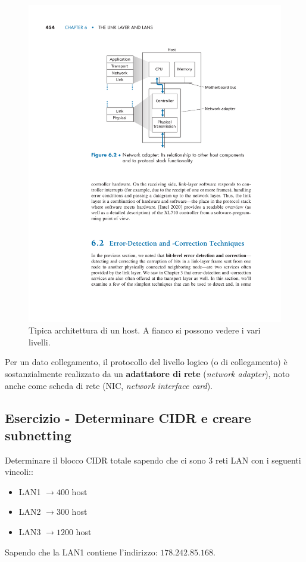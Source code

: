 \documentclass[a4paper]{article}
\begin{document}
	\begin{figure}[!htp]
		\centering
		\includegraphics[width=\textwidth]{img/architettura_host.pdf}
		\caption{Tipica architettura di un host. A fianco si possono vedere i vari livelli.}
	\end{figure}
	
	\noindent
	Per un dato collegamento, il protocollo del livello logico (o di collegamento) è sostanzialmente realizzato da un \textbf{adattatore di rete} (\emph{network adapter}), noto anche come scheda di rete (NIC, \emph{network interface card}).\newpage
	
	\subsection{\textcolor{Red3}{Esercizio - Determinare CIDR e creare subnetting}}
	
	Determinare il blocco \textsf{CIDR} totale sapendo che ci sono 3 reti \textsf{LAN} con i seguenti vincoli::
	\begin{itemize}
		\item \textsf{LAN1} $\longrightarrow 400$ host
		\item \textsf{LAN2} $\longrightarrow 300$ host
		\item \textsf{LAN3} $\longrightarrow 1200$ host
	\end{itemize}
	Sapendo che la \textsf{LAN1} contiene l'indirizzo: $178.242.85.168$.\newline
	
\end{document}
